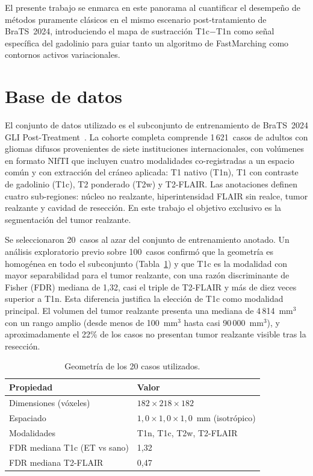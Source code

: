 \documentclass[conference]{IEEEtran}
\begin{document}
El presente trabajo se enmarca en este panorama al cuantificar el
desempe\~{n}o de m\'{e}todos puramente cl\'{a}sicos en el mismo
escenario post-tratamiento de BraTS~2024, introduciendo el mapa
de sustracci\'{o}n T1c$-$T1n como se\~{n}al espec\'{i}fica del
gadolinio para guiar tanto un algoritmo de FastMarching como
contornos activos variacionales.

\section{Base de datos}

El conjunto de datos utilizado es el subconjunto de entrenamiento
de BraTS~2024 GLI Post-Treatment~\cite{deverdier2024brats}.
La cohorte completa comprende 1\,621~casos de adultos con gliomas
difusos provenientes de siete instituciones internacionales, con
vol\'{u}menes en formato NIfTI que incluyen cuatro modalidades
co-registradas a un espacio com\'{u}n y con extracci\'{o}n del
cr\'{a}neo aplicada: T1 nativo (T1n), T1 con contraste de gadolinio
(T1c), T2 ponderado (T2w) y T2-FLAIR.
Las anotaciones definen cuatro sub-regiones: n\'{u}cleo no realzante,
hiperintensidad FLAIR sin realce, tumor realzante y cavidad de
resecci\'{o}n.
En este trabajo el objetivo exclusivo es la segmentaci\'{o}n del
tumor realzante.

Se seleccionaron 20~casos al azar del conjunto de entrenamiento
anotado.
Un an\'{a}lisis exploratorio previo sobre 100~casos confirm\'{o} que
la geometr\'{i}a es homog\'{e}nea en todo el subconjunto
(Tabla~\ref{tab:geometria}) y que T1c es la modalidad con mayor
separabilidad para el tumor realzante, con una raz\'{o}n
discriminante de Fisher (FDR) mediana de 1,32, casi el triple de
T2-FLAIR y m\'{a}s de diez veces superior a T1n.
Esta diferencia justifica la elecci\'{o}n de T1c como modalidad
principal.
El volumen del tumor realzante presenta una mediana de
4\,814~mm$^3$ con un rango amplio (desde menos de 100~mm$^3$
hasta casi 90\,000~mm$^3$), y aproximadamente el 22\% de los
casos no presentan tumor realzante visible tras la resecci\'{o}n.

\begin{table}[h]
\centering\small
\caption{Geometr\'{i}a de los 20 casos utilizados.}
\label{tab:geometria}
\begin{tabular}{ll}
\toprule
Propiedad & Valor \\
\midrule
Dimensiones (v\'{o}xeles) & $182 \times 218 \times 182$ \\
Espaciado & $1{,}0\times 1{,}0\times 1{,}0$~mm (isotr\'{o}pico) \\
Modalidades & T1n, T1c, T2w, T2-FLAIR \\
FDR mediana T1c (ET vs sano) & 1,32 \\
FDR mediana T2-FLAIR & 0,47 \\
\bottomrule
\end{tabular}
\end{table}
\end{document}
